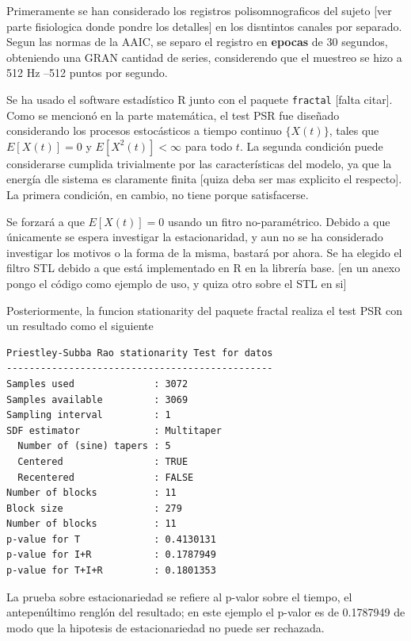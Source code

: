 Primeramente se han considerado los registros polisomnograficos del sujeto [ver parte fisiologica
donde pondre los detalles] en los disntintos
canales por separado. Segun las normas de la AAIC, se separo el registro en \textbf{epocas}
de 30 segundos, obteniendo una GRAN cantidad de series, considerendo que el muestreo se hizo
a 512 Hz --512 puntos por segundo.

Se ha usado el software estad\'istico R junto con el paquete \texttt{fractal} [falta citar].
Como se mencion\'o en la parte matem\'atica, el test PSR fue dise\~nado considerando los
procesos estoc\'asticos a tiempo continuo $\{X(t)\}$, tales que
$E[X(t)]=0$ y $E\left[ X^{2}(t)\right] < \infty$ para todo $t$. La segunda condici\'on
puede considerarse cumplida trivialmente por las caracter\'isticas del modelo, ya que
la energ\'ia dle sistema es claramente finita [quiza deba ser mas explicito el respecto].
La primera condici\'on, en cambio, no tiene porque satisfacerse.

Se forzar\'a a que $E[X(t)]=0$ usando un fitro no-param\'etrico. Debido a que \'unicamente se
espera investigar la estacionaridad, y aun no se ha considerado investigar los motivos o la forma
de la misma, bastar\'a por ahora. Se ha elegido el filtro STL \cite{Coleman87} debido
a que est\'a implementado en R en la librer\'ia base. [en un anexo pongo el c\'odigo
como ejemplo de uso, y quiza otro sobre el STL en si]

Posteriormente, la funcion stationarity del paquete fractal realiza el test PSR
con un resultado como el siguiente

\begin{lstlisting}
Priestley-Subba Rao stationarity Test for datos
-----------------------------------------------
Samples used              : 3072 
Samples available         : 3069 
Sampling interval         : 1 
SDF estimator             : Multitaper 
  Number of (sine) tapers : 5 
  Centered                : TRUE 
  Recentered              : FALSE 
Number of blocks          : 11 
Block size                : 279 
Number of blocks          : 11 
p-value for T             : 0.4130131 
p-value for I+R           : 0.1787949 
p-value for T+I+R         : 0.1801353 
\end{lstlisting}

La prueba sobre estacionariedad se refiere al p-valor sobre el tiempo, el antepen\'ultimo
rengl\'on del resultado; en este ejemplo el p-valor es de 0.1787949 de modo que
la hipotesis de estacionariedad no puede ser rechazada. 


